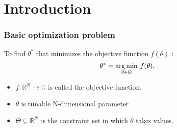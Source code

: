 %
%


\section{Introduction }
\begin{frame}
\frametitle{\centering Basic optimization problem}
\begin{block}{}
\begin{small}
To find $\theta^{*}$ that minimizes the objective function $f(\theta)$ :
\begin{align}\label{eq:opt}
 \theta^* = \underset{\theta \in \Theta}{\mathop{\rm arg\,min}} ~f(\theta),
\end{align}
\end{small}
\end{block}
\begin{small}
\begin{itemize}
\item $f \colon \mathbb{R}^N \to \mathbb{R}$ is called the objective function.
\item $\theta$ is tunable N-dimensional parameter
\item $\Theta \subseteq \mathbb{R}^N$ is the constraint set in which $\theta$ takes values.
\end{itemize}
\end{small}
\end{frame}

